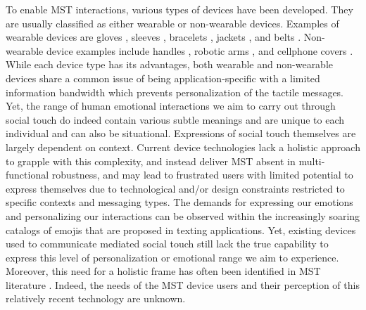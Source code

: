 \documentclass[acmsmall]{acmart}
\begin{document}
To enable MST interactions, various types of devices have been developed. They are usually classified as either wearable or non-wearable devices. Examples of wearable devices are gloves \cite{singhal2017flex}, sleeves \cite{israr2018towards, huisman2013tasst, nunez2020investigating, simons2020contact}, bracelets \cite{pezent2019tasbi, HeyBracelet, BondTouch}, jackets \cite{teh2012mobile, chung2009stress, vaucelle2009design}, and belts \cite{tsetserukou2010haptihug}. Non-wearable device examples include handles \cite{rantala2011role, Frebble}, robotic arms \cite{nakanishi2014remote}, and cellphone covers \cite{park2012couples}. While each device type has its advantages, both wearable and non-wearable devices share a common issue of being application-specific with a limited information bandwidth which prevents personalization of the tactile messages. Yet, the range of human emotional interactions we aim to carry out through social touch do indeed contain various subtle meanings and are unique to each individual and can also be situational. Expressions of social touch themselves are largely dependent on context. Current device technologies lack a holistic approach to grapple with this complexity, and instead deliver MST absent in multi-functional robustness, and may lead to frustrated users with limited potential to express themselves due to technological and/or design constraints restricted to specific contexts and messaging types. 
The demands for expressing our emotions and personalizing our interactions can be observed within the increasingly soaring catalogs of emojis that are proposed in texting applications. Yet, existing devices used to communicate mediated social touch still lack the true capability to express this level of personalization or emotional range we aim to experience. Moreover, this need for a holistic frame has often been identified in MST literature \cite{van2015social, huisman2017social, eid2015affective}. Indeed, the needs of the MST device users and their perception of this relatively recent technology are unknown. 
\end{document}
